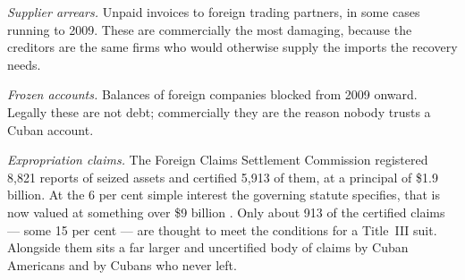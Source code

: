 \emph{Supplier arrears.} Unpaid invoices to foreign trading partners, in some
cases running to 2009. These are commercially the most damaging, because the
creditors are the same firms who would otherwise supply the imports the recovery
needs.

\emph{Frozen accounts.} Balances of foreign companies blocked from 2009 onward.
Legally these are not debt; commercially they are the reason nobody trusts a
Cuban account.

\emph{Expropriation claims.} The Foreign Claims Settlement Commission
registered 8,821 reports of seized assets and certified 5,913 of them, at a
principal of \$1.9 billion. At the 6 per cent simple interest the governing
statute specifies, that is now valued at something over \$9 billion
\citep{fcsc}. Only about
913 of the certified claims --- some 15 per cent --- are thought to meet the
conditions for a Title~III suit. Alongside them sits a far larger and
uncertified body of claims by Cuban Americans and by Cubans who never
left.

